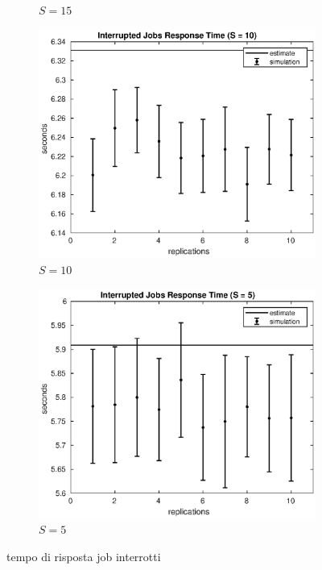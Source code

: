 \begin{figure}[!h]
\begin{subfigure}[t]{0.49\textwidth}
\caption{$S = 15$}
\label{15_sintr}
\end{subfigure}
%
\begin{subfigure}[t]{0.49\textwidth}
\includegraphics[width=\textwidth]{figures/simul/10_500K_sintr}
\caption{$S = 10$}
\label{10_sintr}
\end{subfigure}
%
\begin{subfigure}[t]{0.49\textwidth}
\includegraphics[width=\textwidth]{figures/simul/5_500K_sintr}
\caption{$S = 5$}
\label{5_sintr}
\end{subfigure}
%
\caption{tempo di risposta job interrotti}
\label{plot:sintr}
\end{figure}
%
%

